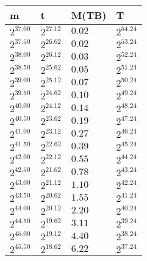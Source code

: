 \\\\
\begin{tabular}{llll}
m & t & M(TB) & T \\ \hline
$2^{37.00}$ & $2^{27.12}$ & $0.02$ & $2^{54.24}$ \\
$2^{37.50}$ & $2^{26.62}$ & $0.02$ & $2^{53.24}$ \\
$2^{38.00}$ & $2^{26.12}$ & $0.03$ & $2^{52.24}$ \\
$2^{38.50}$ & $2^{25.62}$ & $0.05$ & $2^{51.24}$ \\
$2^{39.00}$ & $2^{25.12}$ & $0.07$ & $2^{50.24}$ \\
$2^{39.50}$ & $2^{24.62}$ & $0.10$ & $2^{49.24}$ \\
$2^{40.00}$ & $2^{24.12}$ & $0.14$ & $2^{48.24}$ \\
$2^{40.50}$ & $2^{23.62}$ & $0.19$ & $2^{47.24}$ \\
$2^{41.00}$ & $2^{23.12}$ & $0.27$ & $2^{46.24}$ \\
$2^{41.50}$ & $2^{22.62}$ & $0.39$ & $2^{45.24}$ \\
$2^{42.00}$ & $2^{22.12}$ & $0.55$ & $2^{44.24}$ \\
$2^{42.50}$ & $2^{21.62}$ & $0.78$ & $2^{43.24}$ \\
$2^{43.00}$ & $2^{21.12}$ & $1.10$ & $2^{42.24}$ \\
$2^{43.50}$ & $2^{20.62}$ & $1.55$ & $2^{41.24}$ \\
$2^{44.00}$ & $2^{20.12}$ & $2.20$ & $2^{40.24}$ \\
$2^{44.50}$ & $2^{19.62}$ & $3.11$ & $2^{39.24}$ \\
$2^{45.00}$ & $2^{19.12}$ & $4.40$ & $2^{38.24}$ \\
$2^{45.50}$ & $2^{18.62}$ & $6.22$ & $2^{37.24}$ \\
\end{tabular}
\\\\
 \ 
\\\\
